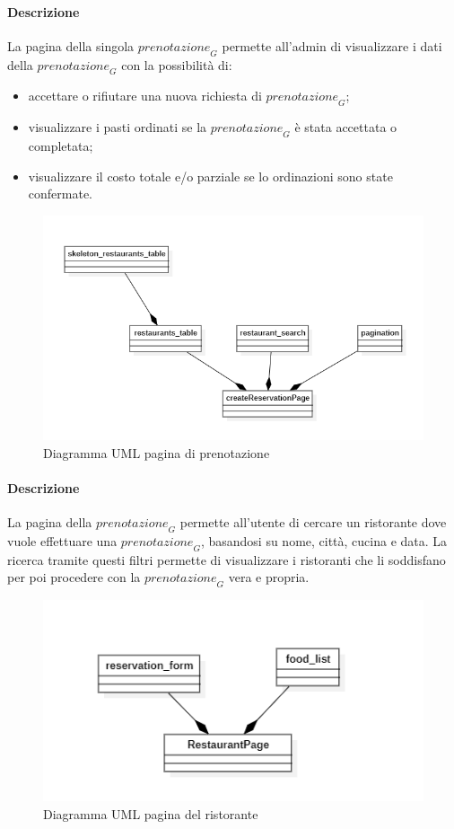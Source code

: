 \paragraph{Descrizione} La pagina della singola $\textit{prenotazione}_G$ permette all'admin di visualizzare i dati della $\textit{prenotazione}_G$ con la possibilità di:
\begin{itemize}
    \item  accettare o rifiutare una nuova richiesta di $\textit{prenotazione}_G$;
    \item  visualizzare i pasti ordinati se la $\textit{prenotazione}_G$ è stata accettata o completata;
    \item  visualizzare il costo totale e/o parziale se lo ordinazioni sono state confermate.
\end{itemize}



\begin{figure}[H]
    \centering
    \includegraphics[width=0.8\linewidth]{images/create_reservation_page.png}
    \caption{Diagramma UML pagina di prenotazione}
    \label{fig:create_reservation_page}
\end{figure}
\paragraph{Descrizione} La pagina della $\textit{prenotazione}_G$ permette all'utente di cercare un ristorante dove vuole effettuare una $\textit{prenotazione}_G$, basandosi su nome, città, cucina e data. 
La ricerca tramite questi filtri permette di visualizzare i ristoranti che li soddisfano per poi procedere con la $\textit{prenotazione}_G$ vera e propria.


\begin{figure}[H]
    \centering
    \includegraphics[width=0.6\linewidth]{images/restaurant_page.png}
    \caption{Diagramma UML pagina del ristorante}
    \label{fig:restaurant_page}
\end{figure}
